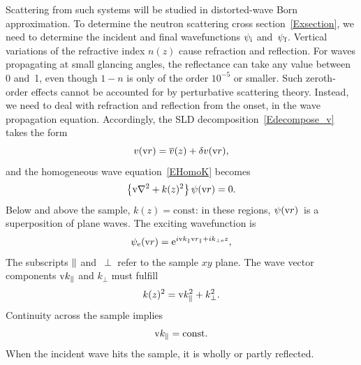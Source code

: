 Scattering from such systems will be studied in distorted-wave Born approximation.
To determine the neutron scattering cross section~\cref{Exsection},
we need to determine the incident and final wavefunctions
$\psi_\si$ and~$\psi_\sf$.
Vertical variations of the refractive index $n(z)$
%
cause refraction and reflection.
%
%
%
For waves propagating at small glancing angles,
the reflectance can take any value between 0 and~1,
even though $1-n$ is only of the order $10^{-5}$ or smaller.
Such zeroth-order effects cannot be accounted for
by perturbative scattering theory.
Instead, we need to deal with refraction and reflection
from the onset, in the wave propagation equation.
Accordingly, the SLD decomposition~\cref{Edecompose_v} takes the form
\begin{equation}\label{Edecompose_vz}
  v(\r) = \mv(z) + \delta v(\r),
\end{equation}
and the homogeneous wave equation~\cref{EHomoK} becomes
\begin{equation}\label{EWaveZ}
  \left\{\Nabla^2+k(z)^2\right\}\psi(\r) = 0.
\end{equation}
Below and above the sample,
$k(z)=\text{const}$:
in these regions, $\psi(\r)$~is a superposition of plane waves.
The exciting wavefunction is
%
%
\begin{equation}\label{Epsiminus}
  \psi_\se(\r) = \e^{i\k_\plll\r_\plll+ik_{\perp\se}z},
\end{equation}
%
%
%
%
The subscripts $\plll$ and~$\perp$ refer to the sample $xy$ plane.
The wave vector components $\k_\plll$ and $k_{\perp}$ must fulfill
\begin{equation}
  k(z)^2=\k_\plll^2+k_{\perp}^2.
\end{equation}
%
%
Continuity across the sample implies
\begin{equation}\label{Ekconst}
  \k_\plll = \text{const}.
\end{equation}
%
%
When the incident wave hits the sample,
it is wholly or partly reflected.
